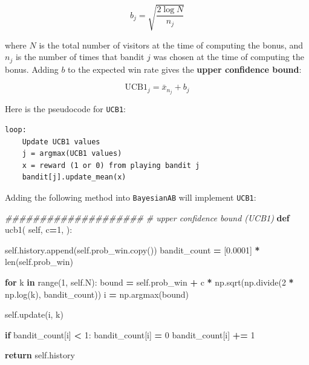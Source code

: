 \documentclass[
]{book}
\newenvironment{Shaded}{\begin{snugshade}}{\end{snugshade}}
\newcommand{\BuiltInTok}[1]{#1}
\newcommand{\CommentTok}[1]{\textcolor[rgb]{0.56,0.35,0.01}{\textit{#1}}}
\newcommand{\ControlFlowTok}[1]{\textcolor[rgb]{0.13,0.29,0.53}{\textbf{#1}}}
\newcommand{\DecValTok}[1]{\textcolor[rgb]{0.00,0.00,0.81}{#1}}
\newcommand{\FloatTok}[1]{\textcolor[rgb]{0.00,0.00,0.81}{#1}}
\newcommand{\KeywordTok}[1]{\textcolor[rgb]{0.13,0.29,0.53}{\textbf{#1}}}
\newcommand{\NormalTok}[1]{#1}
\newcommand{\OperatorTok}[1]{\textcolor[rgb]{0.81,0.36,0.00}{\textbf{#1}}}
\newcommand{\VariableTok}[1]{\textcolor[rgb]{0.00,0.00,0.00}{#1}}
\theoremstyle{definition}
\theoremstyle{definition}
\theoremstyle{definition}
\theoremstyle{definition}
\theoremstyle{remark}
\begin{document}
\[b_j=\sqrt{\frac{2\log{N}}{n_j}}\]

where \(N\) is the total number of visitors at the time of computing the bonus, and \(n_j\) is the number of times that bandit \(j\) was chosen at the time of computing the bonus. Adding \(b\) to the expected win rate gives the \textbf{upper confidence bound}:

\[\text{UCB1}_j=\bar{x}_{n_j}+b_j\]

Here is the pseudocode for \texttt{UCB1}:

\begin{verbatim}
loop:
    Update UCB1 values
    j = argmax(UCB1 values)
    x = reward (1 or 0) from playing bandit j
    bandit[j].update_mean(x)
\end{verbatim}

Adding the following method into \texttt{BayesianAB} will implement \texttt{UCB1}:

\begin{Shaded}
\begin{Highlighting}[]
    \CommentTok{\#\#\#\#\#\#\#\#\#\#\#\#\#\#\#\#\#\#\#\#}
    \CommentTok{\# upper confidence bound (UCB1)}
    \KeywordTok{def}\NormalTok{ ucb1(}
            \VariableTok{self}\NormalTok{,}
\NormalTok{            c}\OperatorTok{=}\DecValTok{1}\NormalTok{,}
\NormalTok{    ):}

        \VariableTok{self}\NormalTok{.history.append(}\VariableTok{self}\NormalTok{.prob\_win.copy())}
\NormalTok{        bandit\_count }\OperatorTok{=}\NormalTok{ [}\FloatTok{0.0001}\NormalTok{] }\OperatorTok{*} \BuiltInTok{len}\NormalTok{(}\VariableTok{self}\NormalTok{.prob\_win)}

        \ControlFlowTok{for}\NormalTok{ k }\KeywordTok{in} \BuiltInTok{range}\NormalTok{(}\DecValTok{1}\NormalTok{, }\VariableTok{self}\NormalTok{.N):}
\NormalTok{            bound }\OperatorTok{=} \VariableTok{self}\NormalTok{.prob\_win }\OperatorTok{+}\NormalTok{ c }\OperatorTok{*}\NormalTok{ np.sqrt(np.divide(}\DecValTok{2} \OperatorTok{*}\NormalTok{ np.log(k), bandit\_count))}
\NormalTok{            i }\OperatorTok{=}\NormalTok{ np.argmax(bound)}

            \VariableTok{self}\NormalTok{.update(i, k)}

            \ControlFlowTok{if}\NormalTok{ bandit\_count[i] }\OperatorTok{\textless{}} \DecValTok{1}\NormalTok{:}
\NormalTok{                bandit\_count[i] }\OperatorTok{=} \DecValTok{0}
\NormalTok{            bandit\_count[i] }\OperatorTok{+=} \DecValTok{1}

        \ControlFlowTok{return} \VariableTok{self}\NormalTok{.history}
\end{Highlighting}
\end{Shaded}
\end{document}
